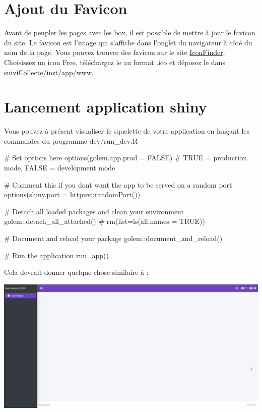 \documentclass[
  letterpaper,
  DIV=11,
  numbers=noendperiod]{scrreprt}
\newenvironment{Shaded}{\begin{snugshade}}{\end{snugshade}}
\newcommand{\AttributeTok}[1]{\textcolor[rgb]{0.40,0.45,0.13}{#1}}
\newcommand{\CommentTok}[1]{\textcolor[rgb]{0.37,0.37,0.37}{#1}}
\newcommand{\ConstantTok}[1]{\textcolor[rgb]{0.56,0.35,0.01}{#1}}
\newcommand{\FunctionTok}[1]{\textcolor[rgb]{0.28,0.35,0.67}{#1}}
\newcommand{\NormalTok}[1]{\textcolor[rgb]{0.00,0.23,0.31}{#1}}
\newcommand{\SpecialCharTok}[1]{\textcolor[rgb]{0.37,0.37,0.37}{#1}}
\begin{document}
\hypertarget{ajout-du-favicon}{%
\section{Ajout du Favicon}\label{ajout-du-favicon}}

Avant de peupler les pages avec les box, il est possible de mettre à
jour le favicon du site. Le favicon est l'image qui s'affiche dans
l'onglet du navigateur à côté du nom de la page. Vous pouvez trouver des
favicon sur le site \href{https://www.iconfinder.com/}{IconFinder}.
Choisissez un icon Free, téléchargez le au format .ico et déposez le
dans suiviCollecte/inst/app/www.

\hypertarget{lancement-application-shiny}{%
\section{Lancement application
shiny}\label{lancement-application-shiny}}

Vous pouvez à présent visualiser le squelette de votre application en
lançant les commandes du programme dev/run\_dev.R

\begin{Shaded}
\begin{Highlighting}[]
\CommentTok{\# Set options here}
\FunctionTok{options}\NormalTok{(}\AttributeTok{golem.app.prod =} \ConstantTok{FALSE}\NormalTok{) }\CommentTok{\# TRUE = production mode, FALSE = development mode}

\CommentTok{\# Comment this if you don\textquotesingle{}t want the app to be served on a random port}
\FunctionTok{options}\NormalTok{(}\AttributeTok{shiny.port =}\NormalTok{ httpuv}\SpecialCharTok{::}\FunctionTok{randomPort}\NormalTok{())}

\CommentTok{\# Detach all loaded packages and clean your environment}
\NormalTok{golem}\SpecialCharTok{::}\FunctionTok{detach\_all\_attached}\NormalTok{()}
\CommentTok{\# rm(list=ls(all.names = TRUE))}

\CommentTok{\# Document and reload your package}
\NormalTok{golem}\SpecialCharTok{::}\FunctionTok{document\_and\_reload}\NormalTok{()}

\CommentTok{\# Run the application}
\FunctionTok{run\_app}\NormalTok{()}
\end{Highlighting}
\end{Shaded}

Cela devrait donner quelque chose similaire à :

\includegraphics{./images/esea_squelette_vide.png}
\end{document}
